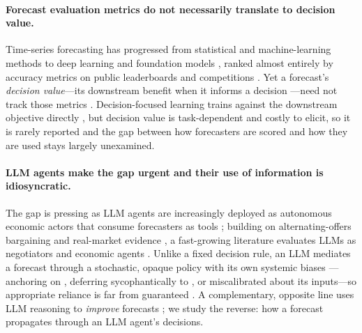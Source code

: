 \documentclass{article}
\begin{document}
\paragraph{Forecast evaluation metrics do not necessarily translate to decision value.} Time-series forecasting has progressed from statistical and machine-learning methods to deep learning and foundation models \citep{petropoulos2020simple,ke2017lightgbm,challu2023nhits,nie2022time,salinas2020deepar,zeng2023transformers,ansari2024chronos,ansari2025chronos,das2023decoder,woo2024unified}, ranked almost entirely by accuracy metrics on public leaderboards and competitions \citep{godahewa2021monash,aksu2024gift,shchur2025fev,qiao2026s,makridakis2022m5}. Yet a forecast's \emph{decision value}---its downstream benefit when it informs a decision \citep{murphy1993good,zhang2024toward}---need not track those metrics \citep{cenesizoglu2012return,zhang2025decision,vancsura2026beyond}. Decision-focused learning trains against the downstream objective directly \citep{wilder2019melding,elmachtoub2022smart,mandi2024decision,donti2017task}, but decision value is task-dependent and costly to elicit, so it is rarely reported and the gap between how forecasters are scored and how they are used stays largely unexamined.

\paragraph{LLM agents make the gap urgent and their use of information is idiosyncratic.} The gap is pressing as LLM agents are increasingly deployed as autonomous economic actors that consume forecasters as tools \citep{hadfield20265,saha2025large}; building on alternating-offers bargaining \citep{rubinstein1982perfect} and real-market evidence \citep{backus2020sequential}, a fast-growing literature evaluates LLMs as negotiators and economic agents \citep{xia2024measuring,bianchi2024well,abdelnabi2024cooperation,yao2025spin,wang2025debt,horton2023large}. Unlike a fixed decision rule, an LLM mediates a forecast through a stochastic, opaque policy with its own systemic biases \citep{taubenfeld2024systematic}---anchoring on \citep{jones2022capturing}, deferring sycophantically to \citep{sharma2024towards}, or miscalibrated about \citep{kadavath2022language} its inputs---so appropriate reliance is far from guaranteed \citep{schemmer2023appropriate}. A complementary, opposite line uses LLM reasoning to \emph{improve} forecasts \citep{ahamed2026stride,liao2026bridging}; we study the reverse: how a forecast propagates through an LLM agent's decisions.
\end{document}
